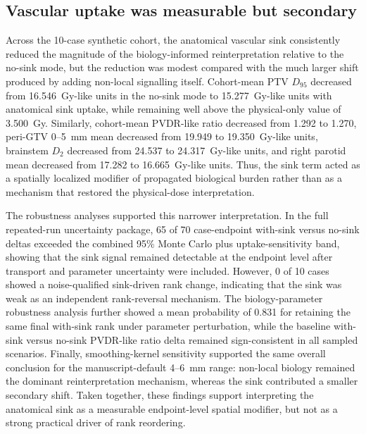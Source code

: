 \documentclass[10pt,a4paper]{article}
\begin{document}
\subsection{Vascular uptake was measurable but secondary}

Across the 10-case synthetic cohort, the anatomical vascular sink consistently reduced the magnitude of the biology-informed reinterpretation relative to the no-sink mode, but the reduction was modest compared with the much larger shift produced by adding non-local signalling itself. Cohort-mean PTV $D_{95}$ decreased from 16.546~Gy-like units in the no-sink mode to 15.277~Gy-like units with anatomical sink uptake, while remaining well above the physical-only value of 3.500~Gy. Similarly, cohort-mean PVDR-like ratio decreased from 1.292 to 1.270, peri-GTV 0--5~mm mean decreased from 19.949 to 19.350~Gy-like units, brainstem $D_{2}$ decreased from 24.537 to 24.317~Gy-like units, and right parotid mean decreased from 17.282 to 16.665~Gy-like units. Thus, the sink term acted as a spatially localized modifier of propagated biological burden rather than as a mechanism that restored the physical-dose interpretation.

The robustness analyses supported this narrower interpretation. In the full repeated-run uncertainty package, 65 of 70 case-endpoint with-sink versus no-sink deltas exceeded the combined 95\% Monte Carlo plus uptake-sensitivity band, showing that the sink signal remained detectable at the endpoint level after transport and parameter uncertainty were included. However, 0 of 10 cases showed a noise-qualified sink-driven rank change, indicating that the sink was weak as an independent rank-reversal mechanism. The biology-parameter robustness analysis further showed a mean probability of 0.831 for retaining the same final with-sink rank under parameter perturbation, while the baseline with-sink versus no-sink PVDR-like ratio delta remained sign-consistent in all sampled scenarios. Finally, smoothing-kernel sensitivity supported the same overall conclusion for the manuscript-default 4--6~mm range: non-local biology remained the dominant reinterpretation mechanism, whereas the sink contributed a smaller secondary shift. Taken together, these findings support interpreting the anatomical sink as a measurable endpoint-level spatial modifier, but not as a strong practical driver of rank reordering.
\end{document}
